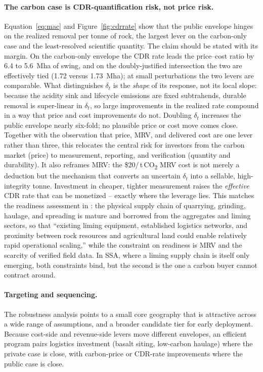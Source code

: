 \documentclass[12pt]{article}
\newcommand{\tco}{\,t\,CO\textsubscript{2}}
\begin{document}
\paragraph{The carbon case is CDR-quantification risk, not price risk.}
Equation~\eqref{eq:mac} and Figure~\ref{fig:cdrrate} show that the public envelope
hinges on the realized removal per tonne of rock, the largest lever on the
carbon-only case and the least-resolved scientific quantity. The claim should be
stated with its margin. On the carbon-only envelope the CDR rate leads the
price--cost ratio by 6.4 to 5.6~Mha of swing, and on the doubly-justified
intersection the two are effectively tied (1.72 versus 1.73~Mha); at small
perturbations the two levers are comparable. What distinguishes
$\delta_t$ is the \emph{shape} of its response, not its local slope: because the
acidity sink and lifecycle emissions are fixed subtrahends, durable removal is
super-linear in $\delta_t$, so large improvements in the realized rate compound in a
way that price and cost improvements do not. Doubling $\delta_t$ increases the
public envelope nearly six-fold; no plausible price or cost move comes close. Together with the
observation that price, MRV, and delivered cost are one lever rather than three,
this relocates the central risk for investors from the carbon market (price) to
measurement, reporting, and verification (quantity and durability). It also
reframes MRV: the \$20/\tco{} MRV cost is not merely a deduction but the mechanism
that converts an uncertain $\delta_t$ into a sellable, high-integrity tonne.
Investment in cheaper, tighter measurement raises the \emph{effective} CDR rate that
can be monetized -- exactly where the leverage lies. This matches the readiness
assessment in \citet[\S12]{suhrhoff2026esroc}: the physical supply chain of
quarrying, grinding, haulage, and spreading is mature and borrowed from the
aggregates and liming sectors, so that ``existing liming equipment, established
logistics networks, and proximity between rock resources and agricultural land
could enable relatively rapid operational scaling,'' while the constraint on
readiness is MRV and the scarcity of verified field data. In SSA, where a
liming supply chain is itself only emerging, both constraints bind, but the
second is the one a carbon buyer cannot contract around.

\paragraph{Targeting and sequencing.} The robustness analysis points to a small
core geography that is attractive across a wide range of assumptions, and a
broader candidate tier for early deployment. Because cost-side and revenue-side
levers move different envelopes, an efficient program pairs logistics
investment (basalt siting, low-carbon haulage) where the private case is close,
with carbon-price or CDR-rate improvements where the public case is close.
\end{document}
